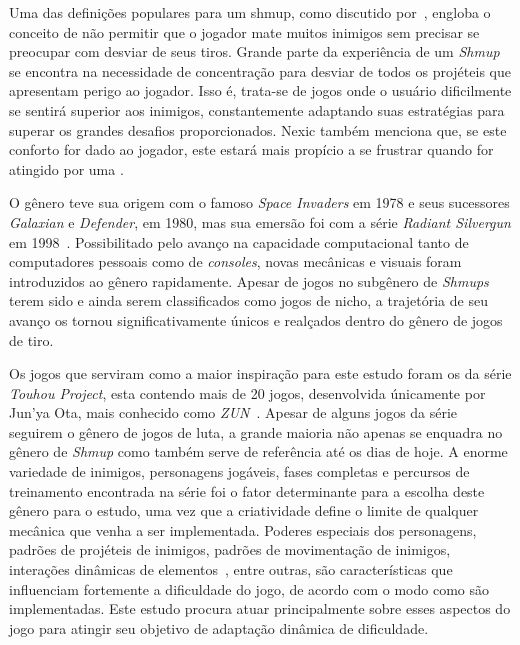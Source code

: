 Uma das definições populares para um shmup, como discutido por~\citet{DosNDontsShmups}, engloba o conceito de não permitir que o jogador mate muitos inimigos sem precisar se preocupar com desviar de seus tiros. Grande parte da experiência de um \textit{Shmup} se encontra na necessidade de concentração para desviar de todos os projéteis que apresentam perigo ao jogador. Isso é, trata-se de jogos onde o usuário dificilmente se sentirá superior aos inimigos, constantemente adaptando suas estratégias para superar os grandes desafios proporcionados. Nexic também menciona que, se este conforto for dado ao jogador, este estará mais propício a se frustrar quando for atingido por uma \textquotedbl{}.

O gênero teve sua origem com o famoso \textit{Space Invaders} em 1978 e seus sucessores \textit{Galaxian} e \textit{Defender}, em 1980, mas sua emersão foi com a série \textit{Radiant Silvergun} em 1998~\citep{Geemu}. Possibilitado pelo avanço na capacidade computacional tanto de computadores pessoais como de \textit{consoles}, novas mecânicas e visuais foram introduzidos ao gênero rapidamente. Apesar de jogos no subgênero de \textit{Shmups} terem sido e ainda serem classificados como jogos de nicho, a trajetória de seu avanço os tornou significativamente únicos e realçados dentro do gênero de jogos de tiro.

Os jogos que serviram como a maior inspiração para este estudo foram os da série \textit{Touhou Project}, esta contendo mais de 20 jogos, desenvolvida únicamente por Jun'ya Ota, mais conhecido como \textit{ZUN}~\citep{Touhou}. Apesar de alguns jogos da série seguirem o gênero de jogos de luta, a grande maioria não apenas se enquadra no gênero de \textit{Shmup} como também serve de referência até os dias de hoje. A enorme variedade de inimigos, personagens jogáveis, fases completas e percursos de treinamento encontrada na série foi o fator determinante para a escolha deste gênero para o estudo, uma vez que a criatividade define o limite de qualquer mecânica que venha a ser implementada. Poderes especiais dos personagens, padrões de projéteis de inimigos, padrões de movimentação de inimigos, interações dinâmicas de elementos~\citep{Ikaruga}, entre outras, são características que influenciam fortemente a dificuldade do jogo, de acordo com o modo como são implementadas. Este estudo procura atuar principalmente sobre esses aspectos do jogo para atingir seu objetivo de adaptação dinâmica de dificuldade.